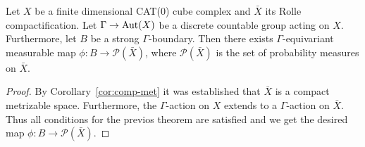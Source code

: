 \begin{cor}
  Let \(X\) be a finite dimensional CAT(0) cube complex and \(\bar X\) its Rolle compactification. Let \(\Gamma \to \operatorname{Aut}(X)\) be a discrete countable group acting on \(X\). Furthermore, let \(B\) be a strong \(\Gamma\)-boundary. Then there exists \(\Gamma\)-equivariant measurable map \(\phi\colon B \to \mathcal{P}(\bar X)\), where \(\mathcal{P}(\bar X)\) is the set of probability measures on \(\bar X\).
\end{cor}

\begin{proof}
  By Corollary~\ref{cor:comp-met} it was established that \(\bar X\) is a compact metrizable space. Furthermore, the \(\Gamma\)-action on \(X\) extends to a \(\Gamma\)-action on \(\bar X\). Thus all conditions for the previos theorem are satisfied and we get the desired map \(\phi\colon B \to \mathcal{P}(\bar X)\).
\end{proof}

